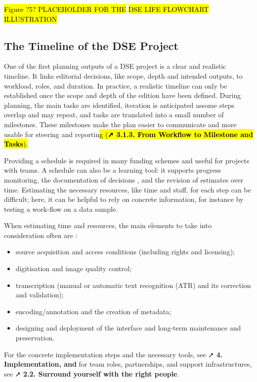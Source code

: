 \documentclass[
  letterpaper,
  DIV=11,
  numbers=noendperiod]{scrreprt}
\begin{document}
\hl{Figure ?5? PLACEHOLDER FOR THE} \hl{DSE LIFE FLOWCHART ILLUSTRATION}

\subsection{The Timeline of the DSE
Project}\label{the-timeline-of-the-dse-project}

One of the first planning outputs of a DSE project is a clear and
realistic timeline. It links editorial decisions, like scope, depth and
intended outputs, to workload, roles, and duration. In practice, a
realistic timeline can only be established once the scope and depth of
the edition have been defined. During planning, the main tasks are
identified, iteration is anticipated assome steps overlap and may
repeat, and tasks are translated into a small number of milestones.
These milestones make the plan easier to communicate and more usable for
steering and reportin\hl{g (\textbf{➚ 3.1.3. From Workflow to Milestone
and Tasks}).}

Providing a schedule is required in many funding schemes and useful for
projects with teams. A schedule can also be a learning tool: it supports
progress monitoring, the documentation of decisions , and the revision
of estimates over time. Estimating the necessary resources, like time
and staff, for each step can be difficult; here, it can be helpful to
rely on concrete information, for instance by testing a work-flow on a
data sample.

When estimating time and resources, the main elements to take into
consideration often are :

\begin{itemize}
\item
  source acquisition and access conditions (including rights and
  licensing);
\item
  digitisation and image quality control;
\item
  transcription (manual or automatic text recognition (ATR) and its
  correction and validation);
\item
  encoding/annotation and the creation of metadata;
\item
  designing and deployment of the interface and long-term maintenance
  and preservation.
\end{itemize}

For the concrete implementation steps and the necessary tools, see ➚
\textbf{4. Implementation, and} for team roles, partnerships, and
support infrastructures, see ➚ \textbf{2.2. Surround yourself with the
right people}.
\end{document}
